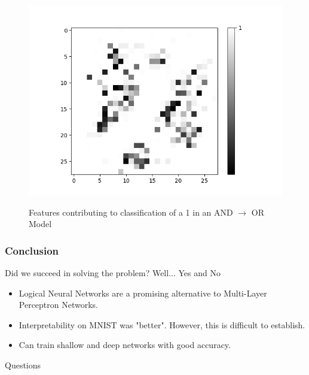 \documentclass[]{beamer}
\begin{document}
\begin{frame}
\begin{minipage}[t]{0.4\textwidth}
\begin{figure}[H]
		\medskip
		
		\begin{minipage}[b]{0.7\textwidth}
			\captionsetup{labelformat=empty}
			\includegraphics[width=\textwidth]{Images/AND-OR(W-LSM)(1)/Like/False/Layer0-Neuron-9.png}
			\label{}
		\end{minipage}
		\caption{Features contributing to classification of a 1 in an  AND $\rightarrow$ OR Model}
		\hfill
	\end{figure}

\end{minipage}
\end{frame}

\begin{frame}
\frametitle{Conclusion}

\begin{block}{Did we succeed in solving the problem? Well... Yes and No}
\begin{itemize}
\item Logical Neural Networks are a promising alternative to Multi-Layer Perceptron Networks.
\item Interpretability on MNIST was "better". However, this is difficult to establish.
\item Can train shallow and deep networks with good accuracy.
\end{itemize}
\end{block}
\end{frame}

\begin{frame}
\begin{center}
\huge Questions
\end{center}
\end{frame}
\end{document}
